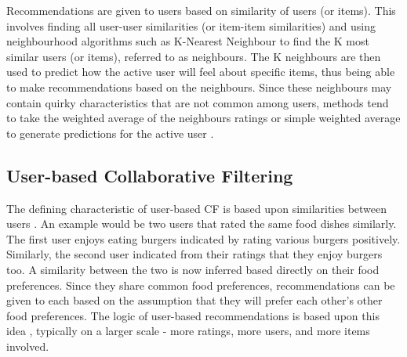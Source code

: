 Recommendations are given to users based on similarity of users (or items). This involves finding all user-user similarities (or item-item similarities) and using neighbourhood algorithms such as K-Nearest Neighbour to find the K most similar users (or items), referred to as neighbours. The K neighbours are then used to predict how the active user will feel about specific items, thus being able to make recommendations based on the neighbours. Since these neighbours may contain quirky characteristics that are not common among users, methods tend to take the weighted average of the neighbours ratings or simple weighted average to generate predictions for the active user \cite{survey}. 







\subsection{User-based Collaborative Filtering}

The defining characteristic of user-based CF is based upon similarities between users \cite{mahoutaction}. An example would be two users that rated the same food dishes similarly. The first user enjoys eating burgers indicated by rating various burgers positively. Similarly, the second user indicated from their ratings that they enjoy burgers too. A similarity between the two is now inferred based directly on their food preferences. Since they share common food preferences, recommendations can be given to each based on the assumption that they will prefer each other's other food preferences. The logic of user-based recommendations is based upon this idea \cite{mahoutaction}, typically on a larger scale - more ratings, more users, and more items involved. 

